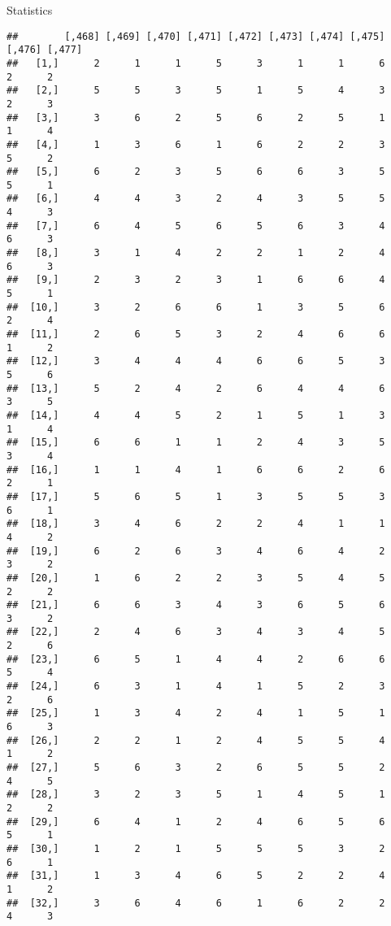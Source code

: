 \documentclass[
  ignorenonframetext,
]{beamer}
\begin{document}
\begin{frame}[fragile]{Statistics}
\begin{verbatim}
##        [,468] [,469] [,470] [,471] [,472] [,473] [,474] [,475] [,476] [,477]
##   [1,]      2      1      1      5      3      1      1      6      2      2
##   [2,]      5      5      3      5      1      5      4      3      2      3
##   [3,]      3      6      2      5      6      2      5      1      1      4
##   [4,]      1      3      6      1      6      2      2      3      5      2
##   [5,]      6      2      3      5      6      6      3      5      5      1
##   [6,]      4      4      3      2      4      3      5      5      4      3
##   [7,]      6      4      5      6      5      6      3      4      6      3
##   [8,]      3      1      4      2      2      1      2      4      6      3
##   [9,]      2      3      2      3      1      6      6      4      5      1
##  [10,]      3      2      6      6      1      3      5      6      2      4
##  [11,]      2      6      5      3      2      4      6      6      1      2
##  [12,]      3      4      4      4      6      6      5      3      5      6
##  [13,]      5      2      4      2      6      4      4      6      3      5
##  [14,]      4      4      5      2      1      5      1      3      1      4
##  [15,]      6      6      1      1      2      4      3      5      3      4
##  [16,]      1      1      4      1      6      6      2      6      2      1
##  [17,]      5      6      5      1      3      5      5      3      6      1
##  [18,]      3      4      6      2      2      4      1      1      4      2
##  [19,]      6      2      6      3      4      6      4      2      3      2
##  [20,]      1      6      2      2      3      5      4      5      2      2
##  [21,]      6      6      3      4      3      6      5      6      3      2
##  [22,]      2      4      6      3      4      3      4      5      2      6
##  [23,]      6      5      1      4      4      2      6      6      5      4
##  [24,]      6      3      1      4      1      5      2      3      2      6
##  [25,]      1      3      4      2      4      1      5      1      6      3
##  [26,]      2      2      1      2      4      5      5      4      1      2
##  [27,]      5      6      3      2      6      5      5      2      4      5
##  [28,]      3      2      3      5      1      4      5      1      2      2
##  [29,]      6      4      1      2      4      6      5      6      5      1
##  [30,]      1      2      1      5      5      5      3      2      6      1
##  [31,]      1      3      4      6      5      2      2      4      1      2
##  [32,]      3      6      4      6      1      6      2      2      4      3

\end{verbatim}
\end{frame}
\end{document}
